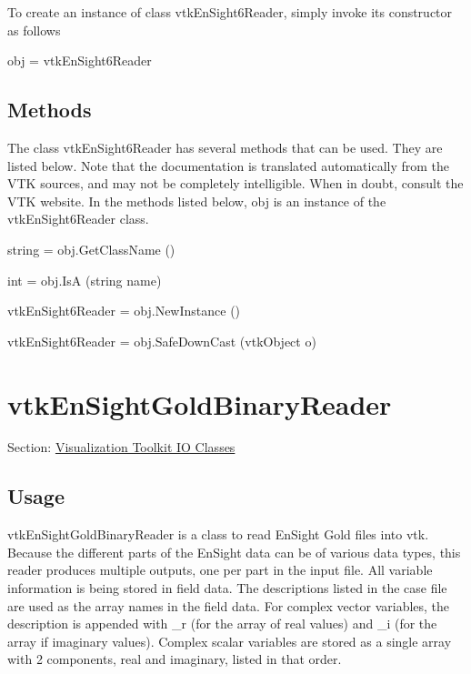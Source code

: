 To create an instance of class vtk\-En\-Sight6\-Reader, simply invoke its constructor as follows \begin{DoxyVerb}  obj = vtkEnSight6Reader
\end{DoxyVerb}
 \hypertarget{vtkwidgets_vtkxyplotwidget_Methods}{}\subsection{Methods}\label{vtkwidgets_vtkxyplotwidget_Methods}
The class vtk\-En\-Sight6\-Reader has several methods that can be used. They are listed below. Note that the documentation is translated automatically from the V\-T\-K sources, and may not be completely intelligible. When in doubt, consult the V\-T\-K website. In the methods listed below, {\ttfamily obj} is an instance of the vtk\-En\-Sight6\-Reader class. 
\begin{DoxyItemize}
\item {\ttfamily string = obj.\-Get\-Class\-Name ()}  
\item {\ttfamily int = obj.\-Is\-A (string name)}  
\item {\ttfamily vtk\-En\-Sight6\-Reader = obj.\-New\-Instance ()}  
\item {\ttfamily vtk\-En\-Sight6\-Reader = obj.\-Safe\-Down\-Cast (vtk\-Object o)}  
\end{DoxyItemize}\hypertarget{vtkio_vtkensightgoldbinaryreader}{}\section{vtk\-En\-Sight\-Gold\-Binary\-Reader}\label{vtkio_vtkensightgoldbinaryreader}
Section\-: \hyperlink{sec_vtkio}{Visualization Toolkit I\-O Classes} \hypertarget{vtkwidgets_vtkxyplotwidget_Usage}{}\subsection{Usage}\label{vtkwidgets_vtkxyplotwidget_Usage}
vtk\-En\-Sight\-Gold\-Binary\-Reader is a class to read En\-Sight Gold files into vtk. Because the different parts of the En\-Sight data can be of various data types, this reader produces multiple outputs, one per part in the input file. All variable information is being stored in field data. The descriptions listed in the case file are used as the array names in the field data. For complex vector variables, the description is appended with \-\_\-r (for the array of real values) and \-\_\-i (for the array if imaginary values). Complex scalar variables are stored as a single array with 2 components, real and imaginary, listed in that order.

